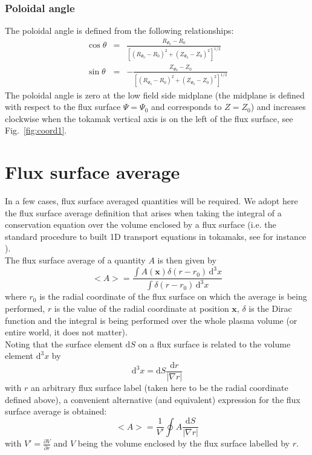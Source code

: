 \documentclass[fleqn]{report}
\begin{document}
\subsubsection{Poloidal angle}
The poloidal angle is defined from the following relationships:
\begin{eqnarray}
 \cos \theta &=& \frac{R_{\Psi_0}-R_0}{\left[ (R_{\Psi_0}-R_0)^2 + (Z_{\Psi_0}-Z_0)^2 \right]^{1/2}}\\
 \sin \theta &=& -\frac{Z_{\Psi_0}-Z_0}{\left[ (R_{\Psi_0}-R_0)^2 + (Z_{\Psi_0}-Z_0)^2 \right]^{1/2}}
\end{eqnarray}
The poloidal angle is zero at the low field side midplane (the midplane is defined with respect to the flux surface $\Psi=\Psi_0$ and corresponds to $Z=Z_0$) and increases clockwise when the tokamak vertical axis is on the left of the flux surface, see Fig.~\ref{fig:coord1}.

\section{Flux surface average}
In a few cases, flux surface averaged quantities will be required. We adopt here the flux surface average definition that arises when taking the integral of a conservation equation over the volume enclosed by a flux surface (i.e. the standard procedure to built 1D transport equations in tokamaks, see for instance \cite{Hinton:RMP1976}).\\
The flux surface average of a quantity $A$ is then given by
\begin{equation}
 <A> = \frac{\int A(\mathbf{x}) \delta(r-r_0) \,\textrm{d}^3{x}}{\int\delta(r-r_0) \,\textrm{d}^3{x}}
\end{equation}
where $r_0$ is the radial coordinate of the flux surface on which the average is being 
performed, $r$ is the value of the radial coordinate at position $\mathbf{x}$, $\delta$ is the Dirac function and the integral is being performed over the whole plasma volume (or entire world, it does not matter).  \\
Noting that the surface element $\textrm{d} S$ on a flux surface is related to the volume element 
$\textrm{d}^3x$ by
\begin{equation}
 \textrm{d}^3x = \textrm{d} S \frac{\textrm{d}r}{|\nabla r|}
\end{equation}
with $r$ an arbitrary flux surface label (taken here to be the radial coordinate defined above), a convenient alternative (and equivalent) expression for the flux surface average is obtained:
\begin{equation} 
 <A> = \frac{1}{V'} \oint A \frac{\textrm{d}S}{|\nabla r|}
\end{equation}
with $V'= \frac{\partial V}{\partial r}$ and $V$ being the volume enclosed by the flux surface labelled by $r$. 
\end{document}
